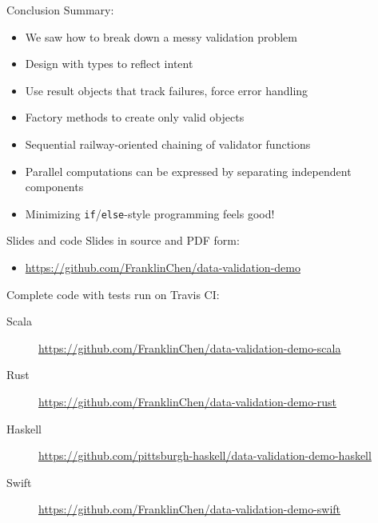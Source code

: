 \begin{frame}{Conclusion}
  Summary:
  \begin{itemize}
  \item We saw how to break down a messy validation problem
  \item Design with types to reflect intent
  \item Use result objects that track failures, force error handling
  \item Factory methods to create only valid objects
  \item Sequential railway-oriented chaining of validator functions
  \item Parallel computations can be expressed by separating
    independent components
  \item Minimizing
    \texttt{if}/\texttt{else}-style programming feels good!
  \end{itemize}
\end{frame}

\begin{frame}{Slides and code}
  Slides in source and PDF form:
  \begin{itemize}
  \item \url{https://github.com/FranklinChen/data-validation-demo}
  \end{itemize}

  Complete code with tests run on Travis CI:
  \begin{description}
  \item[Scala] \url{https://github.com/FranklinChen/data-validation-demo-scala}
  \item[Rust] \url{https://github.com/FranklinChen/data-validation-demo-rust}
  \item[Haskell] \url{https://github.com/pittsburgh-haskell/data-validation-demo-haskell}
  \item[Swift] \url{https://github.com/FranklinChen/data-validation-demo-swift}
  \end{description}
\end{frame}


